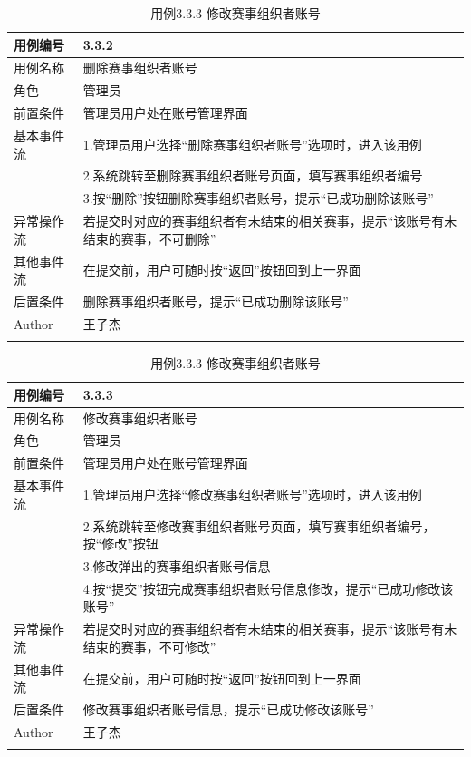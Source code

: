 \documentclass[a4paper,UTF8]{article}
\begin{document}
\begin{table}[H]
	\begin{center}
		\caption{用例3.3.2 删除赛事组织者账号}
		\label{table:Tab_uc332}
		\begin{tabular}{|p{}|p{}|}
			\hline\noalign{\smallskip}
			用例编号 & 3.3.2\\
			\hline
			用例名称 &  删除赛事组织者账号\\
			\hline
			角色 & 管理员\\
			\hline
			前置条件 & 管理员用户处在账号管理界面 \\
			\hline
			基本事件流 & 1.管理员用户选择“删除赛事组织者账号”选项时，进入该用例 \\& 2.系统跳转至删除赛事组织者账号页面，填写赛事组织者编号 \\& 3.按“删除”按钮删除赛事组织者账号，提示“已成功删除该账号” \\
			\hline
			异常操作流 & 若提交时对应的赛事组织者有未结束的相关赛事，提示“该账号有未结束的赛事，不可删除” \\
			\hline
			其他事件流 & 在提交前，用户可随时按“返回”按钮回到上一界面 \\
			\hline
			后置条件 & 删除赛事组织者账号，提示“已成功删除该账号” \\
			\hline
			Author & 王子杰 \\
			\noalign{\smallskip}
			\hline
			\noalign{\smallskip}
		\end{tabular}
		\caption{用例3.3.3 修改赛事组织者账号}
		\label{table:Tab_uc333}
		\begin{tabular}{|p{}|p{}|}
			\hline\noalign{\smallskip}
			用例编号 & 3.3.3\\
			\hline
			用例名称 &  修改赛事组织者账号\\
			\hline
			角色 & 管理员\\
			\hline
			前置条件 & 管理员用户处在账号管理界面 \\
			\hline
			基本事件流 & 1.管理员用户选择“修改赛事组织者账号”选项时，进入该用例 \\& 2.系统跳转至修改赛事组织者账号页面，填写赛事组织者编号，按“修改”按钮 \\& 3.修改弹出的赛事组织者账号信息 \\& 4.按“提交”按钮完成赛事组织者账号信息修改，提示“已成功修改该账号” \\
			\hline
			异常操作流 & 若提交时对应的赛事组织者有未结束的相关赛事，提示“该账号有未结束的赛事，不可修改” \\
			\hline
			其他事件流 & 在提交前，用户可随时按“返回”按钮回到上一界面 \\
			\hline
			后置条件 & 修改赛事组织者账号信息，提示“已成功修改该账号” \\
			\hline
			Author & 王子杰 \\
			\noalign{\smallskip}
			\hline
			\noalign{\smallskip}
		\end{tabular}
	\end{center}
\end{table}
\end{document}
